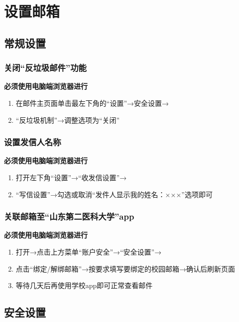 \section[设置邮箱]{设置邮箱}

\subsection[常规设置]{常规设置}

\subsubsection[关闭“反垃圾邮件”功能]{关闭“反垃圾邮件”功能\footnotemark}
\textbf{必须使用电脑端浏览器进行}
\begin{enumerate}
    \item 在邮件主页面单击最左下角的“设置”→安全设置→
    \item “反垃圾机制”→调整选项为“关闭”
\end{enumerate}

\subsubsection[设置发信人名称]{设置发信人名称\footnotemark}
\textbf{必须使用电脑端浏览器进行}
\begin{enumerate}
    \item 打开左下角“设置”→“收发信设置”→
    \item “写信设置”→勾选或取消“发件人显示我的姓名：×××”选项即可
\end{enumerate}

\subsubsection[关联邮箱至“山东第二医科大学”app]{关联邮箱至“山东第二医科大学”app}
\textbf{必须使用电脑端浏览器进行}
\begin{enumerate}
    \item 打开→点击上方菜单“账户安全”→“安全设置”→
    \item 点击“绑定/解绑邮箱”→按要求填写要绑定的校园邮箱→确认后刷新页面
    \item 等待几天后再使用学校app即可正常查看邮件
\end{enumerate}
\subsection[安全设置]{安全设置}

